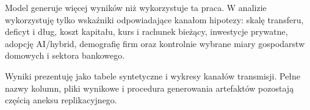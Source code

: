 Model generuje więcej wyników niż wykorzystuje ta praca. W analizie wykorzystuję tylko wskaźniki odpowiadające kanałom hipotezy: skalę transferu, deficyt i dług, koszt kapitału, kurs i rachunek bieżący, inwestycje prywatne, adopcję AI/hybrid, demografię firm oraz kontrolnie wybrane miary gospodarstw domowych i sektora bankowego.



Wyniki prezentuję jako tabele syntetyczne i wykresy kanałów transmisji. Pełne nazwy kolumn, pliki wynikowe i procedura generowania artefaktów pozostają częścią aneksu replikacyjnego.
